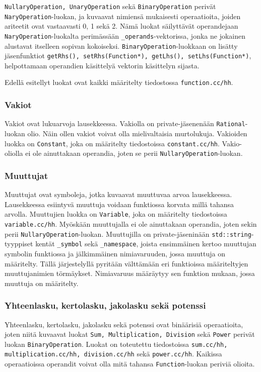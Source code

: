 \documentclass[10pt,a4paper]{article}
\begin{document}
\lstinline!NullaryOperation, UnaryOperation! sekä \lstinline!BinaryOperation! perivät \lstinline!NaryOperation!-luokan, ja kuvaavat nimiensä mukaisesti operaatioita, joiden ariteetit ovat vastaavasti 0, 1 sekä 2.
Nämä luokat säilyttävät operandejaan \lstinline!NaryOperation!-luokalta perimässään \lstinline!_operands!-vektorissa, jonka ne jokainen alustavat itselleen sopivan kokoiseksi. \lstinline!BinaryOperation!-luokkaan on lisätty jäsenfunktiot \lstinline!getRhs(), setRhs(Function*), getLhs(), setLhs(Function*)!, helpottamaan operandien käsittelyä vektorin käsittelyn sijasta.

Edellä esitellyt luokat ovat kaikki määritelty tiedostossa \texttt{function.cc/hh}.

\subsubsection{Vakiot}
Vakiot ovat lukuarvoja lausekkeessa. Vakiolla on private-jäsenenään \lstinline!Rational!-luokan olio.
Näin ollen vakiot voivat olla mielivaltaisia murtolukuja.
Vakioiden luokka on \lstinline!Constant!, joka on määritelty tiedostoissa \texttt{constant.cc/hh}.
Vakio-oliolla ei ole ainuttakaan operandia, joten se perii \lstinline!NullaryOperation!-luokan.

\subsubsection{Muuttujat}
Muuttujat ovat symboleja, jotka kuvaavat muuttuvaa arvoa lausekkeessa. Lausekkeessa esiintyvä muuttuja
voidaan funktiossa korvata millä tahansa arvolla. Muuttujien luokka on \lstinline!Variable!, joka on määritelty tiedostoissa \texttt{variable.cc/hh}. Myöskään muuttujalla ei ole ainuttakaan operandia, joten sekin perii \lstinline!NullaryOperation!-luokan. Muuttujilla on private-jäseninään \lstinline!std::string!-tyyppiset kentät \lstinline!_symbol! sekä \lstinline!_namespace!, joista ensimmäinen kertoo muuttujan symbolin funktiossa ja jälkimmäinen nimiavaruuden, jossa muuttuja on määritelty. Tällä järjestelyllä pyritään välttämään eri funktioissa määriteltyjen muuttujanimien törmäykset.
Nimiavaruus määräytyy sen funktion mukaan, jossa muuttuja on määritelty.

\subsubsection{Yhteenlasku, kertolasku, jakolasku sekä potenssi}
Yhteenlasku, kertolasku, jakolasku sekä potenssi ovat binäärisiä operaatioita, joten niitä kuvaavat luokat \lstinline!Sum, Multiplication, Division! sekä \lstinline!Power! perivät luokan \lstinline!BinaryOperation!. Luokat on toteutettu tiedostoissa \texttt{sum.cc/hh, multiplication.cc/hh, division.cc/hh} sekä \texttt{power.cc/hh}.
Kaikissa operaatioissa operandit voivat olla mitä tahansa \lstinline!Function!-luokan periviä olioita.
\end{document}
